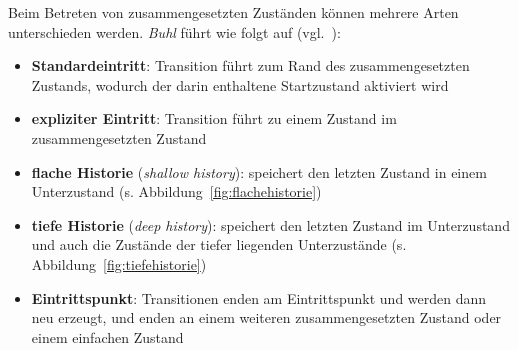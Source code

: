 \noindent
Beim Betreten von zusammengesetzten Zuständen können mehrere Arten unterschieden werden. \textit{Buhl} führt wie folgt auf (vgl.~\cite[73]{Buh09}):

\begin{itemize}
    \item \textbf{Standardeintritt}: Transition führt zum Rand des zusammengesetzten Zustands, wodurch der darin enthaltene Startzustand aktiviert wird
    \item \textbf{expliziter Eintritt}: Transition führt zu einem Zustand im zusammengesetzten Zustand
    \item \textbf{flache Historie} (\textit{shallow history}): speichert den letzten Zustand in einem Unterzustand (s. Abbildung~\ref{fig:flachehistorie})
    \item \textbf{tiefe Historie} (\textit{deep history}): speichert den letzten Zustand im Unterzustand und auch die Zustände der tiefer liegenden Unterzustände  (s. Abbildung~\ref{fig:tiefehistorie})
    \item \textbf{Eintrittspunkt}: Transitionen enden am Eintrittspunkt und werden dann neu erzeugt, und enden an einem weiteren zusammengesetzten Zustand oder einem einfachen Zustand
\end{itemize}

